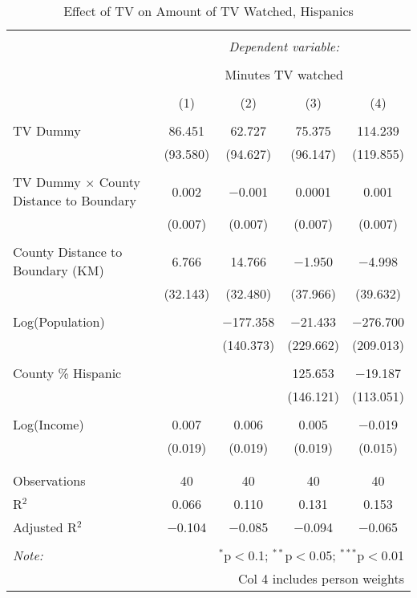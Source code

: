 
\begin{table}[!htbp] \centering 
  \caption{Effect of TV on Amount of TV Watched, Hispanics} 
  \label{} 
\begin{tabular}{@{\extracolsep{-5pt}}lcccc} 
\\[-1.8ex]\hline 
\hline \\[-1.8ex] 
 & \multicolumn{4}{c}{\textit{Dependent variable:}} \\ 
\cline{2-5} 
\\[-1.8ex] & \multicolumn{4}{c}{Minutes TV watched} \\ 
\\[-1.8ex] & (1) & (2) & (3) & (4)\\ 
\hline \\[-1.8ex] 
 TV Dummy & 86.451 & 62.727 & 75.375 & 114.239 \\ 
  & (93.580) & (94.627) & (96.147) & (119.855) \\ 
  & & & & \\ 
 TV Dummy $\times$ County Distance to Boundary  & 0.002 & $-$0.001 & 0.0001 & 0.001 \\ 
  & (0.007) & (0.007) & (0.007) & (0.007) \\ 
  & & & & \\ 
 County Distance to Boundary (KM) & 6.766 & 14.766 & $-$1.950 & $-$4.998 \\ 
  & (32.143) & (32.480) & (37.966) & (39.632) \\ 
  & & & & \\ 
 Log(Population) &  & $-$177.358 & $-$21.433 & $-$276.700 \\ 
  &  & (140.373) & (229.662) & (209.013) \\ 
  & & & & \\ 
 County \% Hispanic &  &  & 125.653 & $-$19.187 \\ 
  &  &  & (146.121) & (113.051) \\ 
  & & & & \\ 
 Log(Income) & 0.007 & 0.006 & 0.005 & $-$0.019 \\ 
  & (0.019) & (0.019) & (0.019) & (0.015) \\ 
  & & & & \\ 
\hline \\[-1.8ex] 
Observations & 40 & 40 & 40 & 40 \\ 
R$^{2}$ & 0.066 & 0.110 & 0.131 & 0.153 \\ 
Adjusted R$^{2}$ & $-$0.104 & $-$0.085 & $-$0.094 & $-$0.065 \\ 
\hline 
\hline \\[-1.8ex] 
\textit{Note:}  & \multicolumn{4}{r}{$^{*}$p$<$0.1; $^{**}$p$<$0.05; $^{***}$p$<$0.01} \\ 
 & \multicolumn{4}{r}{Col 4 includes person weights} \\ 
\end{tabular} 
\end{table} 
